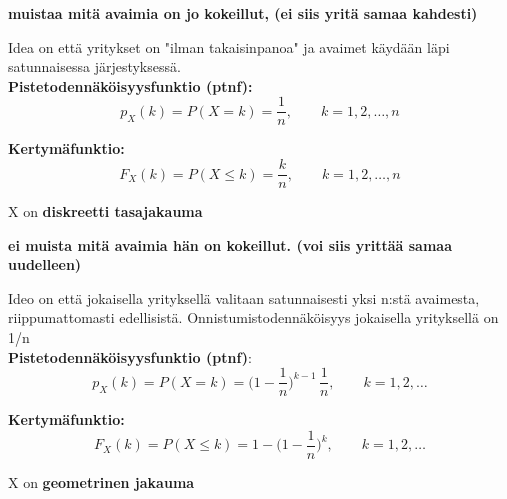\documentclass[12pt,a4paper]{article}
\begin{document}
\begin{kohta}
\item \textbf{muistaa mitä avaimia on jo kokeillut, (ei siis yritä samaa kahdesti)}

Idea on että yritykset on "ilman takaisinpanoa" ja avaimet
käydään läpi satunnaisessa järjestyksessä.\\

\textbf{Pistetodennäköisyysfunktio (ptnf):}
\[
p_X(k)=P(X=k)=\frac{1}{n},\qquad k=1,2,\dots,n
\]

\textbf{Kertymäfunktio:}
\[
F_X(k)=P(X\le k)=\frac{k}{n},\qquad k=1,2,\dots,n
\]



X on \textbf{diskreetti tasajakauma}
\item \textbf{ei muista mitä avaimia hän on kokeillut. (voi siis yrittää samaa uudelleen)}

Ideo on että jokaisella yrityksellä valitaan satunnaisesti yksi n:stä avaimesta, 
riippumattomasti edellisistä. Onnistumistodennäköisyys jokaisella
yrityksellä on 1/n\\

\textbf{Pistetodennäköisyysfunktio (ptnf)}:
\[
p_X(k)=P(X=k)=\Big(1-\frac{1}{n}\Big)^{k-1}\,\frac{1}{n},\qquad k=1,2,\dots
\]

\textbf{Kertymäfunktio:}
\[
F_X(k)=P(X\le k)=1-\Big(1-\frac{1}{n}\Big)^{k},\qquad k=1,2,\dots
\]


X on \textbf{geometrinen jakauma}
\end{kohta}
\end{document}
